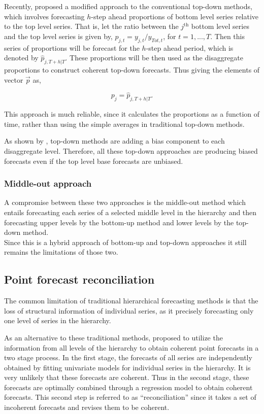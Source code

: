 \documentclass[graybox]{svmult}
\begin{document}
Recently, \cite{Mircetic2017} proposed a modified approach to the conventional top-down methods, which involves forecasting $h$-step ahead proportions of bottom level series relative to the top level series. That is, let the ratio between the $j^\text{th}$ bottom level series and the top level series is given by, $p_{j,t}=y_{j,t}/y_{Tot,t}$, for $t=1,...,T$. Then this series of proportions will be forecast for the $h$-step ahead period, which is denoted by $\hat{p}_{j,T+h|T}$. These proportions will be then used as the disaggregate proportions to construct coherent top-down forecasts. Thus giving the elements of vector $\vec{p}$ as,

\begin{equation}
p_j = \hat{p}_{j,T+h|T}.
\end{equation}   

This approach is much reliable, since it calculates the proportions as a function of time, rather than using the simple averages in traditional top-down methods. 

As shown by \cite{hyndman2011}, top-down methods are adding a bias component to each disaggregate level. Therefore, all these top-down approaches are producing biased forecasts even if the top level base forecasts are unbiased.  


\subsubsection{Middle-out approach}

A compromise between these two approaches is the middle-out method which entails forecasting each series of a selected middle level in the hierarchy and then forecasting upper levels by the bottom-up method and lower levels by the top-down method.\\
Since this is a hybrid approach of bottom-up and top-down approaches it still remains the limitations of those two. 


\subsection{Point forecast reconciliation}

The common limitation of traditional hierarchical forecasting methods is that the loss of structural information of individual series, as it precisely forecasting only one level of series in the hierarchy.  

As an alternative to these traditional methods, \citet{hyndman2011} proposed to utilize the information from all levels of the hierarchy to obtain coherent point forecasts in  a two stage process. In the first stage, the forecasts of all series are independently obtained by fitting univariate models for individual series in the hierarchy. It is very unlikely that these forecasts are coherent. Thus in the second stage, these forecasts are optimally combined through a regression model to obtain coherent forecasts. This second step is referred to as ``reconciliation'' since it takes a set of incoherent forecasts and revises them to be coherent.
\end{document}
